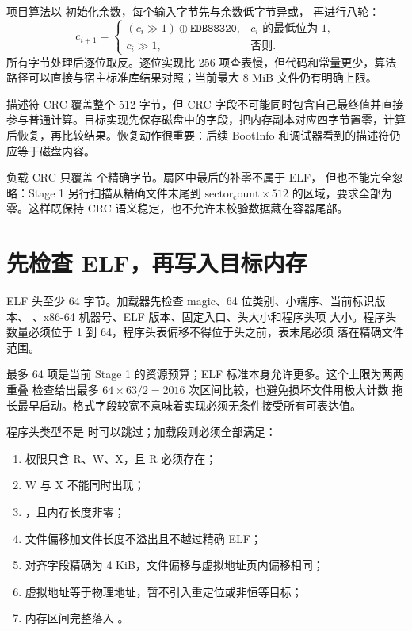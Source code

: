 项目算法以  初始化余数，每个输入字节先与余数低字节异或，
再进行八轮：
\[
  c_{i+1}=
  \begin{cases}
    (c_i\gg1)\oplus\mathtt{EDB88320},&c_i\text{ 的最低位为 1},\\
    c_i\gg1,&\text{否则}.
  \end{cases}
\]
所有字节处理后逐位取反。逐位实现比 256 项查表慢，但代码和常量更少，算法
路径可以直接与宿主标准库结果对照；当前最大 8 MiB 文件仍有明确上限。

描述符 CRC 覆盖整个 512 字节，但 CRC 字段不可能同时包含自己最终值并直接
参与普通计算。目标实现先保存磁盘中的字段，把内存副本对应四字节置零，计算
后恢复，再比较结果。恢复动作很重要：后续 BootInfo 和调试器看到的描述符仍
应等于磁盘内容。

负载 CRC 只覆盖  个精确字节。扇区中最后的补零不属于 ELF，
但也不能完全忽略：Stage 1 另行扫描从精确文件末尾到
\(\mathrm{sector_count}\times512\) 的区域，要求全部为零。这样既保持 CRC
语义稳定，也不允许未校验数据藏在容器尾部。

\section{先检查 ELF，再写入目标内存}

ELF 头至少 64 字节。加载器先检查 magic、64 位类别、小端序、当前标识版本、
、x86-64 机器号、ELF 版本、固定入口、头大小和程序头项
大小。程序头数量必须位于 1 到 64，程序头表偏移不得位于头之前，表末尾必须
落在精确文件范围。

最多 64 项是当前 Stage 1 的资源预算；ELF 标准本身允许更多。这个上限为两两重叠
检查给出最多 \(64\times63/2=2016\) 次区间比较，也避免损坏文件用极大计数
拖长最早启动。格式字段较宽不意味着实现必须无条件接受所有可表达值。

程序头类型不是  时可以跳过；加载段则必须全部满足：

\begin{enumerate}[label=\arabic*.]
  \item 权限只含 R、W、X，且 R 必须存在；
  \item W 与 X 不能同时出现；
  \item {}，且内存长度非零；
  \item 文件偏移加文件长度不溢出且不越过精确 ELF；
  \item 对齐字段精确为 4 KiB，文件偏移与虚拟地址页内偏移相同；
  \item 虚拟地址等于物理地址，暂不引入重定位或非恒等目标；
  \item 内存区间完整落入 。
\end{enumerate}

